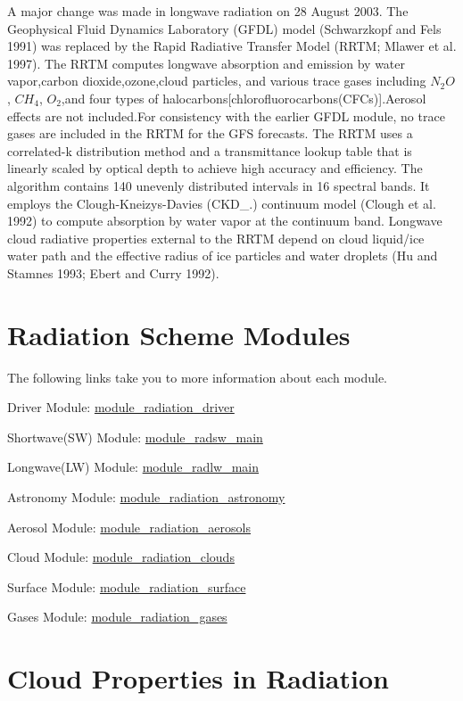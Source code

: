 A major change was made in longwave radiation on 28 August 2003. The Geophysical Fluid Dynamics Laboratory (G\+F\+DL) model (Schwarzkopf and Fels 1991) was replaced by the Rapid Radiative Transfer Model (R\+R\+TM; Mlawer et al. 1997). The R\+R\+TM computes longwave absorption and emission by water vapor,carbon dioxide,ozone,cloud particles, and various trace gases including $N_2O$, $CH_4$, $O_2$,and four types of halocarbons\mbox{[}chlorofluorocarbons(\+C\+F\+Cs)\mbox{]}.Aerosol effects are not included.\+For consistency with the earlier G\+F\+DL module, no trace gases are included in the R\+R\+TM for the G\+FS forecasts. The R\+R\+TM uses a correlated-\/k distribution method and a transmittance lookup table that is linearly scaled by optical depth to achieve high accuracy and efficiency. The algorithm contains 140 unevenly distributed intervals in 16 spectral bands. It employs the Clough-\/\+Kneizys-\/\+Davies (C\+K\+D\+\_.) continuum model (Clough et al. 1992) to compute absorption by water vapor at the continuum band. Longwave cloud radiative properties external to the R\+R\+TM depend on cloud liquid/ice water path and the effective radius of ice particles and water droplets (Hu and Stamnes 1993; Ebert and Curry 1992).\hypertarget{index_mainpage-components}{}\section{Radiation Scheme Modules}\label{index_mainpage-components}
The following links take you to more information about each module.
\begin{DoxyItemize}
\item Driver Module\+: \hyperlink{namespacemodule__radiation__driver}{module\+\_\+radiation\+\_\+driver}
\item Shortwave(\+S\+W) Module\+: \hyperlink{namespacemodule__radsw__main}{module\+\_\+radsw\+\_\+main}
\item Longwave(\+L\+W) Module\+: \hyperlink{namespacemodule__radlw__main}{module\+\_\+radlw\+\_\+main}
\item Astronomy Module\+: \hyperlink{namespacemodule__radiation__astronomy}{module\+\_\+radiation\+\_\+astronomy}
\item Aerosol Module\+: \hyperlink{namespacemodule__radiation__aerosols}{module\+\_\+radiation\+\_\+aerosols}
\item Cloud Module\+: \hyperlink{namespacemodule__radiation__clouds}{module\+\_\+radiation\+\_\+clouds}
\item Surface Module\+: \hyperlink{namespacemodule__radiation__surface}{module\+\_\+radiation\+\_\+surface}
\item Gases Module\+: \hyperlink{namespacemodule__radiation__gases}{module\+\_\+radiation\+\_\+gases}
\end{DoxyItemize}\hypertarget{index_component}{}\section{Cloud Properties in Radiation}\label{index_component}
